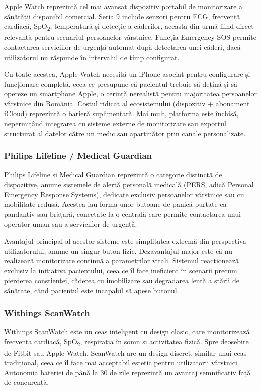 ﻿\documentclass[12pt,a4paper,twoside]{article}
\newcommand{\spo}{SpO\textsubscript{2}}
\begin{document}
Apple Watch reprezintă cel mai avansat dispozitiv portabil de monitorizare a sănătății disponibil comercial. Seria 9 include senzori pentru ECG, frecvență cardiacă, \spo, temperatură și detecție a căderilor, aceasta din urmă fiind direct relevantă pentru scenariul persoanelor vârstnice. Funcția Emergency SOS permite contactarea serviciilor de urgență automat după detectarea unei căderi, dacă utilizatorul nu răspunde în intervalul de timp configurat.

Cu toate acestea, Apple Watch necesită un iPhone asociat pentru configurare și funcționare completă, ceea ce presupune că pacientul trebuie să dețină și să opereze un smartphone Apple, o cerință nerealistă pentru majoritatea persoanelor vârstnice din România. Costul ridicat al ecosistemului (dispozitiv + abonament iCloud) reprezintă o barieră suplimentară. Mai mult, platforma este închisă, nepermițând integrarea cu sisteme externe de monitorizare sau exportul structurat al datelor către un medic sau aparținător prin canale personalizate.

\subsubsection{Philips Lifeline / Medical Guardian}

Philips Lifeline și Medical Guardian reprezintă o categorie distinctă de dispozitive, anume sistemele de alertă personală medicală (PERS, adică Personal Emergency Response Systems), dedicate exclusiv persoanelor vârstnice sau cu mobilitate redusă. Acestea iau forma unor butoane de panică purtate ca pandantiv sau brățară, conectate la o centrală care permite contactarea unui operator uman sau a serviciilor de urgență.

Avantajul principal al acestor sisteme este simplitatea extremă din perspectiva utilizatorului, anume un singur buton fizic. Dezavantajul major este că nu realizează monitorizare continuă a parametrilor vitali. Sistemul reacționează exclusiv la inițiativa pacientului, ceea ce îl face ineficient în scenarii precum pierderea conștienței, căderea cu imobilizare sau degradarea lentă a stării de sănătate, când pacientul este incapabil să apese butonul.

\subsubsection{Withings ScanWatch}

Withings ScanWatch este un ceas inteligent cu design clasic, care monitorizează frecvența cardiacă, \spo, respirația în somn și activitatea fizică. Spre deosebire de Fitbit sau Apple Watch, ScanWatch are un design discret, similar unui ceas tradițional, ceea ce îl face mai acceptabil estetic pentru utilizatorii vârstnici. Autonomia bateriei de până la 30 de zile reprezintă un avantaj semnificativ față de concurență.
\end{document}

